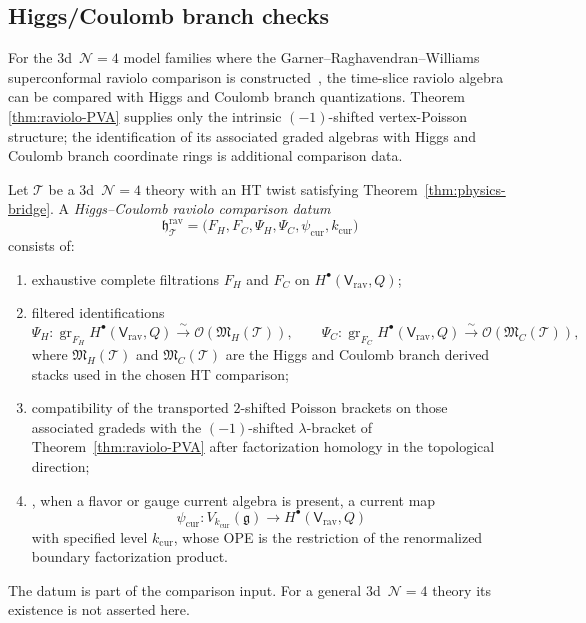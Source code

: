 \subsection{Higgs/Coulomb branch checks}
\label{subsec:Higgs-Coulomb}
For the \(3\)d~\(\mathcal N=4\) model families where the
Garner--Raghavendran--Williams superconformal raviolo comparison is
constructed~\cite{GRW21}, the time-slice raviolo algebra can be
compared with Higgs and Coulomb branch quantizations.  Theorem
\ref{thm:raviolo-PVA} supplies only the intrinsic
\((-1)\)-shifted vertex-Poisson structure; the identification of its
associated graded algebras with Higgs and Coulomb branch coordinate
rings is additional comparison data.

\begin{definition}
\label{def:higgs-coulomb-raviolo-comparison-datum}
Let \(\mathcal T\) be a \(3\)d~\(\mathcal N=4\) theory with an HT twist
satisfying Theorem~\ref{thm:physics-bridge}.  A
\emph{Higgs--Coulomb raviolo comparison datum}
\[
\mathfrak h_{\mathcal T}^{\mathrm{rav}}
=
\bigl(F_H,F_C,\Psi_H,\Psi_C,\psi_{\mathrm{cur}},k_{\mathrm{cur}}\bigr)
\]
consists of:
\begin{enumerate}[label=\textup{(\roman*)},leftmargin=1.8em]
\item exhaustive complete filtrations \(F_H\) and \(F_C\) on
 \(H^\bullet(\mathsf V_{\mathrm{rav}},Q)\);
\item filtered identifications
\[
\Psi_H\colon
\operatorname{gr}_{F_H}H^\bullet(\mathsf V_{\mathrm{rav}},Q)
\xrightarrow{\sim}\mathcal O(\mathfrak M_H(\mathcal T)),
\qquad
\Psi_C\colon
\operatorname{gr}_{F_C}H^\bullet(\mathsf V_{\mathrm{rav}},Q)
\xrightarrow{\sim}\mathcal O(\mathfrak M_C(\mathcal T)),
\]
where \(\mathfrak M_H(\mathcal T)\) and \(\mathfrak M_C(\mathcal T)\)
are the Higgs and Coulomb branch derived stacks used in the chosen
HT comparison;
\item compatibility of the transported \(2\)-shifted Poisson brackets
on those associated gradeds with the \((-1)\)-shifted
\(\lambda\)-bracket of Theorem~\ref{thm:raviolo-PVA} after
factorization homology in the topological direction;
\item, when a flavor or gauge current algebra is present, a current
map
\[
\psi_{\mathrm{cur}}\colon V_{k_{\mathrm{cur}}}(\mathfrak g)
\longrightarrow H^\bullet(\mathsf V_{\mathrm{rav}},Q)
\]
with specified level \(k_{\mathrm{cur}}\), whose OPE is the
restriction of the renormalized boundary factorization product.
\end{enumerate}
The datum is part of the comparison input.  For a general
\(3\)d~\(\mathcal N=4\) theory its existence is not asserted here.
\end{definition}

